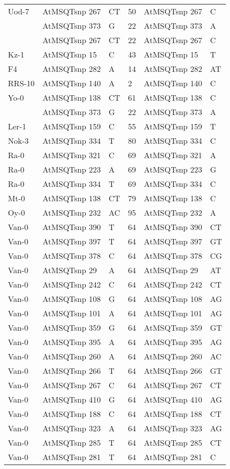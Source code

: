 \begin{center}
\begin{longtable}{|l|l|l|l|l|l|}
Uod-7&AtMSQTsnp 267&CT&50&AtMSQTsnp 267&C\\
&AtMSQTsnp 373&G&22&AtMSQTsnp 373&A\\
&AtMSQTsnp 267&CT&22&AtMSQTsnp 267&C\\
Kz-1&AtMSQTsnp 15&C&43&AtMSQTsnp 15&T\\
F4&AtMSQTsnp 282&A&14&AtMSQTsnp 282&AT\\
RRS-10&AtMSQTsnp 140&A&2&AtMSQTsnp 140&C\\
Yo-0&AtMSQTsnp 138&CT&61&AtMSQTsnp 138&C\\
&AtMSQTsnp 373&G&22&AtMSQTsnp 373&A\\
Ler-1&AtMSQTsnp 159&C&55&AtMSQTsnp 159&T\\
Nok-3&AtMSQTsnp 334&T&80&AtMSQTsnp 334&C\\
Ra-0&AtMSQTsnp 321&C&69&AtMSQTsnp 321&A\\
Ra-0&AtMSQTsnp 223&A&69&AtMSQTsnp 223&G\\
Ra-0&AtMSQTsnp 334&T&69&AtMSQTsnp 334&C\\
Mt-0&AtMSQTsnp 138&CT&79&AtMSQTsnp 138&C\\
Oy-0&AtMSQTsnp 232&AC&95&AtMSQTsnp 232&A\\
Van-0&AtMSQTsnp 390&T&64&AtMSQTsnp 390&CT\\
Van-0&AtMSQTsnp 397&T&64&AtMSQTsnp 397&GT\\
Van-0&AtMSQTsnp 378&C&64&AtMSQTsnp 378&CG\\
Van-0&AtMSQTsnp 29&A&64&AtMSQTsnp 29&AT\\
Van-0&AtMSQTsnp 242&C&64&AtMSQTsnp 242&CT\\
Van-0&AtMSQTsnp 108&G&64&AtMSQTsnp 108&AG\\
Van-0&AtMSQTsnp 101&A&64&AtMSQTsnp 101&AG\\
Van-0&AtMSQTsnp 359&G&64&AtMSQTsnp 359&GT\\
Van-0&AtMSQTsnp 395&A&64&AtMSQTsnp 395&AG\\
Van-0&AtMSQTsnp 260&A&64&AtMSQTsnp 260&AC\\
Van-0&AtMSQTsnp 266&T&64&AtMSQTsnp 266&GT\\
Van-0&AtMSQTsnp 267&C&64&AtMSQTsnp 267&CT\\
Van-0&AtMSQTsnp 410&G&64&AtMSQTsnp 410&AG\\
Van-0&AtMSQTsnp 188&C&64&AtMSQTsnp 188&CT\\
Van-0&AtMSQTsnp 323&A&64&AtMSQTsnp 323&AG\\
Van-0&AtMSQTsnp 285&T&64&AtMSQTsnp 285&CT\\
Van-0&AtMSQTsnp 281&T&64&AtMSQTsnp 281&C\\

\end{longtable}
\end{center}

